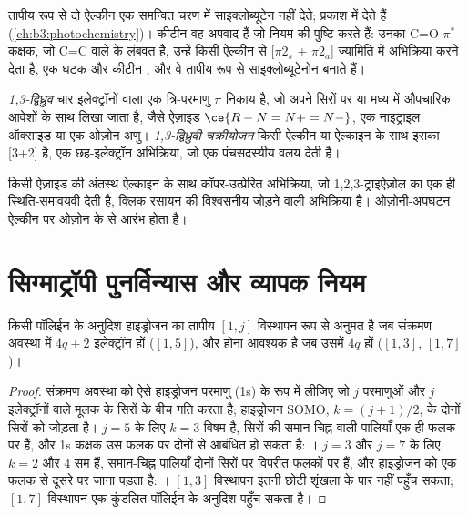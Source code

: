 तापीय रूप से दो ऐल्कीन एक समन्वित चरण में साइक्लोब्यूटेन नहीं देते;
प्रकाश में देते हैं (\cref{ch:b3:photochemistry})। कीटीन वह अपवाद हैं जो
नियम की पुष्टि करते हैं: उनका C=O $\pi^*$ कक्षक, जो C=C वाले के लंबवत है, उन्हें
किसी ऐल्कीन से [$\pi2_s$ + $\pi2_a$] ज्यामिति में अभिक्रिया करने देता है, एक घटक  और
कीटीन , और वे तापीय रूप से साइक्लोब्यूटेनोन बनाते हैं।

\begin{definition}[1,3-द्विध्रुवी चक्रीयोजन]\label{def:b3:pericyclic:dipolar}
\emph{1,3-द्विध्रुव} चार इलेक्ट्रॉनों वाला एक त्रि-परमाणु $\pi$ निकाय है,
जो अपने सिरों पर या मध्य में औपचारिक आवेशों के साथ लिखा जाता है, जैसे
ऐज़ाइड $\ce{R-N=N+=N-}$, एक नाइट्राइल ऑक्साइड या एक ओज़ोन अणु। \emph{1,3-द्विध्रुवी
चक्रीयोजन} किसी ऐल्कीन या ऐल्काइन के साथ इसका [3+2]  है, एक
छह-इलेक्ट्रॉन अभिक्रिया, जो एक पंचसदस्यीय वलय देती है।
\end{definition}

किसी ऐज़ाइड की अंतस्थ ऐल्काइन के साथ कॉपर-उत्प्रेरित अभिक्रिया, जो 1,2,3-ट्राइऐज़ोल का
एक ही स्थिति-समावयवी देती है, क्लिक रसायन की विश्वसनीय जोड़ने वाली अभिक्रिया है।
ओज़ोनी-अपघटन ऐल्कीन पर ओज़ोन के  से आरंभ होता है।

\section{सिग्माट्रॉपी पुनर्विन्यास और व्यापक नियम}

\begin{proposition}[हाइड्रोजन विस्थापन]\label{prop:b3:pericyclic:sigmatropic-h}
किसी पॉलिईन के अनुदिश हाइड्रोजन का तापीय $[1, j]$ विस्थापन  रूप से अनुमत है जब
संक्रमण अवस्था में $4q + 2$ इलेक्ट्रॉन हों ($[1,5]$), और  होना आवश्यक है जब उसमें $4q$ हों
($[1,3]$, $[1,7]$)।
\end{proposition}

\begin{proof}
संक्रमण अवस्था को ऐसे हाइड्रोजन परमाणु (1s) के रूप में लीजिए जो $j$ परमाणुओं और
$j$ इलेक्ट्रॉनों वाले मूलक के सिरों के बीच गति करता है; हाइड्रोजन SOMO, $k = (j + 1)/2$, के दोनों सिरों को
जोड़ता है। $j = 5$ के लिए $k = 3$ विषम है, सिरों की समान चिह्न वाली पालियाँ एक ही फलक पर हैं,
और 1s कक्षक उस फलक पर दोनों से आबंधित हो सकता है: । $j = 3$ और $j = 7$ के लिए
$k = 2$ और $4$ सम हैं, समान-चिह्न पालियाँ दोनों सिरों पर विपरीत फलकों पर हैं, और
हाइड्रोजन को एक फलक से दूसरे पर जाना पड़ता है: । $[1,3]$ विस्थापन
इतनी छोटी शृंखला के पार नहीं पहुँच सकता; $[1,7]$ विस्थापन एक कुंडलित पॉलिईन के अनुदिश पहुँच सकता है।
\end{proof}

